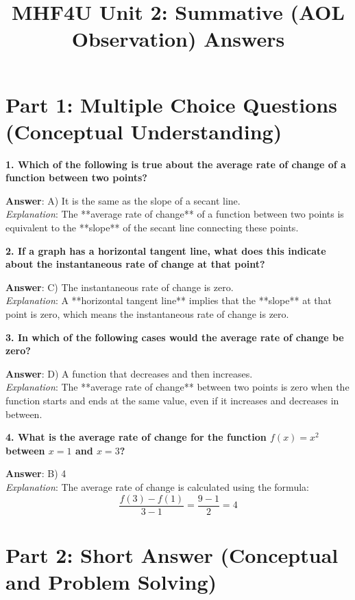 \documentclass{article}
\title{MHF4U Unit 2: Summative (AOL Observation) Answers}
\author{}
\date{}
\begin{document}
\maketitle

\section*{Part 1: Multiple Choice Questions (Conceptual Understanding)}

\textbf{1. Which of the following is true about the average rate of change of a function between two points?}

\textbf{Answer}: A) It is the same as the slope of a secant line. \\
\textit{Explanation}: The **average rate of change** of a function between two points is equivalent to the **slope** of the secant line connecting these points.

\bigskip

\textbf{2. If a graph has a horizontal tangent line, what does this indicate about the instantaneous rate of change at that point?}

\textbf{Answer}: C) The instantaneous rate of change is zero. \\
\textit{Explanation}: A **horizontal tangent line** implies that the **slope** at that point is zero, which means the instantaneous rate of change is zero.

\bigskip

\textbf{3. In which of the following cases would the average rate of change be zero?}

\textbf{Answer}: D) A function that decreases and then increases. \\
\textit{Explanation}: The **average rate of change** between two points is zero when the function starts and ends at the same value, even if it increases and decreases in between.

\bigskip

\textbf{4. What is the average rate of change for the function \( f(x) = x^2 \) between \( x = 1 \) and \( x = 3 \)?}

\textbf{Answer}: B) 4 \\
\textit{Explanation}: The average rate of change is calculated using the formula:
\[
\frac{f(3) - f(1)}{3 - 1} = \frac{9 - 1}{2} = 4
\]

\newpage

\section*{Part 2: Short Answer (Conceptual and Problem Solving)}
\end{document}
